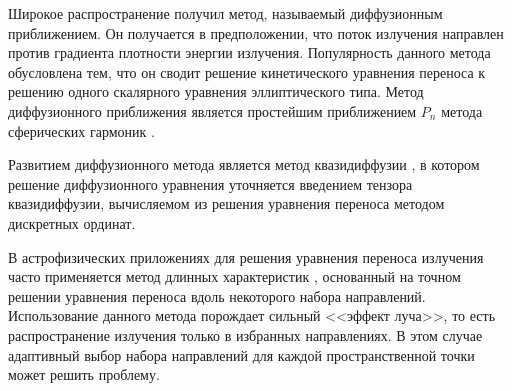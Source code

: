 Широкое распространение получил метод, называемый диффузионным приближением. Он получается в предположении, что поток излучения направлен против градиента плотности энергии излучения. Популярность данного метода обусловлена тем, что он сводит решение кинетического уравнения переноса к решению одного скалярного уравнения эллиптического типа. Метод диффузионного приближения является простейшим приближением $P_n$ метода сферических гармоник \cite{Marshak1947,vladimirov1961,Devison1960}.

Развитием диффузионного метода является метод квазидиффузии \cite{Goldin1964}, в котором решение диффузионного уравнения уточняется введением тензора квазидиффузии, вычисляемом из решения уравнения переноса методом дискретных ординат.

В астрофизических приложениях для решения уравнения переноса излучения часто применяется метод длинных характеристик \cite{vladimirov1961}, основанный на точном решении уравнения переноса вдоль некоторого набора направлений. Использование данного метода порождает сильный <<эффект луча>>, то есть распространение излучения только в избранных направлениях. В этом случае адаптивный выбор набора направлений \cite{Galanin2010} для каждой пространственной точки может решить проблему. 